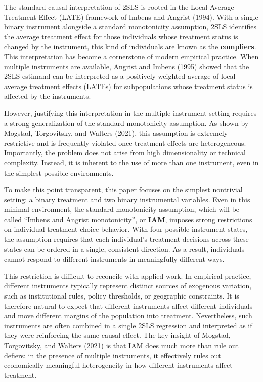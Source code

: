 \documentclass[
  12pt,
  a4paper,
  oneside]{article}
\begin{document}
The standard causal interpretation of 2SLS is rooted in the Local
Average Treatment Effect (LATE) framework of Imbens and Angrist (1994).
With a single binary instrument alongside a standard monotonicity
assumption, 2SLS identifies the average treatment effect for those
individuals whose treatment status is changed by the instrument, this
kind of individuals are known as the \textbf{compliers}. This
interpretation has become a cornerstone of modern empirical practice.
When multiple instruments are available, Angrist and Imbens (1995)
showed that the 2SLS estimand can be interpreted as a positively
weighted average of local average treatment effects (LATEs) for
subpopulations whose treatment status is affected by the instruments.

However, justifying this interpretation in the multiple-instrument
setting requires a strong generalization of the standard monotonicity
assumption. As shown by Mogstad, Torgovitsky, and Walters (2021), this
assumption is extremely restrictive and is frequently violated once
treatment effects are heterogeneous. Importantly, the problem does not
arise from high dimensionality or technical complexity. Instead, it is
inherent to the use of more than one instrument, even in the simplest
possible environments.

To make this point transparent, this paper focuses on the simplest
nontrivial setting: a binary treatment and two binary instrumental
variables. Even in this minimal environment, the standard monotonicity
assumption, which will be called ``Imbens and Angrist monotonicity'', or
\textbf{IAM}, imposes strong restrictions on individual treatment choice
behavior. With four possible instrument states, the assumption requires
that each individual's treatment decisions across these states can be
ordered in a single, consistent direction. As a result, individuals
cannot respond to different instruments in meaningfully different ways.

This restriction is difficult to reconcile with applied work. In
empirical practice, different instruments typically represent distinct
sources of exogenous variation, such as institutional rules, policy
thresholds, or geographic constraints. It is therefore natural to expect
that different instruments affect different individuals and move
different margins of the population into treatment. Nevertheless, such
instruments are often combined in a single 2SLS regression and
interpreted as if they were reinforcing the same causal effect. The key
insight of Mogstad, Torgovitsky, and Walters (2021) is that IAM does
much more than rule out defiers: in the presence of multiple
instruments, it effectively rules out economically meaningful
heterogeneity in how different instruments affect treatment.
\end{document}
